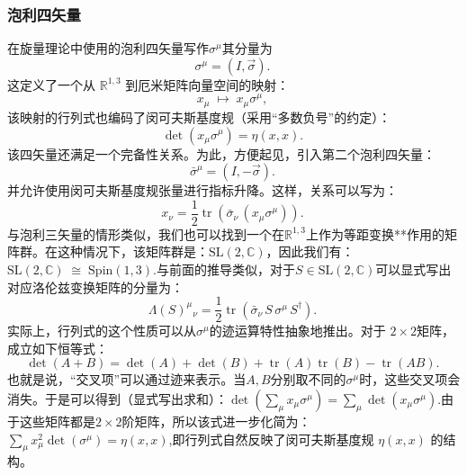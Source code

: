 \subsubsection{泡利四矢量}
在旋量理论中使用的泡利四矢量写作$\sigma^\mu$其分量为
$$
\sigma^\mu = (I, {\vec{\sigma}}).~
$$
这定义了一个从 $\mathbb{R}^{1,3}$ 到厄米矩阵向量空间的映射：
$$
x_\mu \;\mapsto\; x_\mu \sigma^\mu ,~
$$
该映射的行列式也编码了闵可夫斯基度规（采用“多数负号”的约定）：
$$
\det(x_\mu \sigma^\mu) = \eta(x, x) .~
$$
该四矢量还满足一个完备性关系。为此，方便起见，引入第二个泡利四矢量：
$$
\bar{\sigma}^\mu = (I, -{\vec{\sigma}}) .~
$$
并允许使用闵可夫斯基度规张量进行指标升降。这样，关系可以写为：
$$
x_\nu = \frac{1}{2} \operatorname{tr} \left( \bar{\sigma}_\nu \, (x_\mu \sigma^\mu) \right).~
$$
与泡利三矢量的情形类似，我们也可以找到一个在$\mathbb{R}^{1,3}$上作为等距变换**作用的矩阵群。在这种情况下，该矩阵群是：$\mathrm{SL}(2, \mathbb{C})$，因此我们有：$\mathrm{SL}(2, \mathbb{C}) \;\cong\; \mathrm{Spin}(1,3)$.与前面的推导类似，对于$S \in \mathrm{SL}(2, \mathbb{C})$可以显式写出对应洛伦兹变换矩阵的分量为：
$$
\Lambda(S)^{\mu}{}_{\nu} = 
\frac{1}{2} 
\operatorname{tr}\!\left( \bar{\sigma}_\nu \, S \, \sigma^\mu \, S^\dagger \right).~
$$
实际上，行列式的这个性质可以从$\sigma^\mu$的迹运算特性抽象地推出。对于 $2\times 2$矩阵，成立如下恒等式：
$$
\det(A+B) = \det(A) + \det(B) + \operatorname{tr}(A)\operatorname{tr}(B) - \operatorname{tr}(AB).~
$$
也就是说，“交叉项”可以通过迹来表示。当$A, B$分别取不同的$\sigma^\mu$时，这些交叉项会消失。于是可以得到（显式写出求和）：$\det\!\left( \sum_{\mu} x_\mu \sigma^\mu \right)= \sum_{\mu} \det\!\left( x_\mu \sigma^\mu \right).$由于这些矩阵都是$2\times 2$阶矩阵，所以该式进一步化简为：$\sum_{\mu} x_\mu^2 \det(\sigma^\mu)=\eta(x, x)$,即行列式自然反映了闵可夫斯基度规 $\eta(x,x)$ 的结构。
